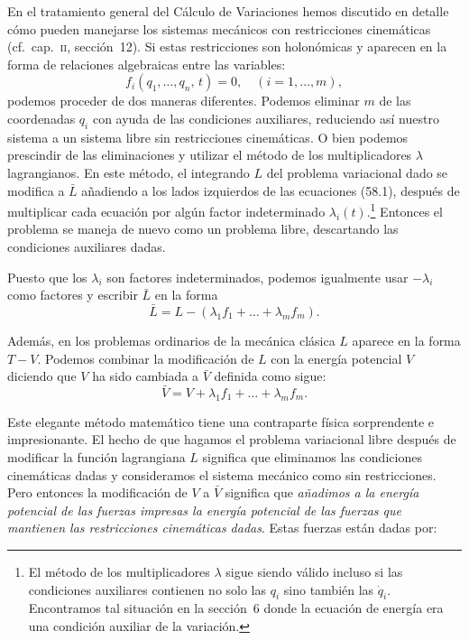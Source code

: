 \documentclass[12pt,a4paper]{book}
\begin{document}
En el tratamiento general del Cálculo de Variaciones hemos discutido en detalle cómo pueden manejarse los sistemas mecánicos con restricciones cinemáticas (cf.\ cap.~\textsc{ii}, sección~12). Si estas restricciones son holonómicas y aparecen en la forma de relaciones algebraicas entre las variables:
\begin{equation}
f_i(q_1, \ldots, q_n,\, t) = 0, \quad (i = 1, \ldots, m), \tag{58.1}
\end{equation}
podemos proceder de dos maneras diferentes. Podemos eliminar $m$ de las coordenadas $q_i$ con ayuda de las condiciones auxiliares, reduciendo así nuestro sistema a un sistema libre sin restricciones cinemáticas. O bien podemos prescindir de las eliminaciones y utilizar el método de los multiplicadores $\lambda$ lagrangianos. En este método, el integrando $L$ del problema variacional dado se modifica a $\bar{L}$ añadiendo a los lados izquierdos de las ecuaciones (58.1), después de multiplicar cada ecuación por algún factor indeterminado $\lambda_i(t)$.\footnote{El método de los multiplicadores $\lambda$ sigue siendo válido incluso si las condiciones auxiliares contienen no solo las $q_i$ sino también las $\dot{q}_i$. Encontramos tal situación en la sección~6 donde la ecuación de energía era una condición auxiliar de la variación.} Entonces el problema se maneja de nuevo como un problema libre, descartando las condiciones auxiliares dadas.

Puesto que los $\lambda_i$ son factores indeterminados, podemos igualmente usar $-\lambda_i$ como factores y escribir $\bar{L}$ en la forma
\begin{equation}
\bar{L} = L - (\lambda_1 f_1 + \ldots + \lambda_m f_m). \tag{58.2}
\end{equation}

Además, en los problemas ordinarios de la mecánica clásica $L$ aparece en la forma $T - V$. Podemos combinar la modificación de $L$ con la energía potencial $V$ diciendo que $V$ ha sido cambiada a $\bar{V}$ definida como sigue:
\begin{equation}
\bar{V} = V + \lambda_1 f_1 + \ldots + \lambda_m f_m. \tag{58.3}
\end{equation}

Este elegante método matemático tiene una contraparte física sorprendente e impresionante. El hecho de que hagamos el problema variacional libre después de modificar la función lagrangiana $L$ significa que eliminamos las condiciones cinemáticas dadas y consideramos el sistema mecánico como sin restricciones. Pero entonces la modificación de $V$ a $\bar{V}$ significa que \textit{añadimos a la energía potencial de las fuerzas impresas la energía potencial de las fuerzas que mantienen las restricciones cinemáticas dadas}. Estas fuerzas están dadas por:
\end{document}
